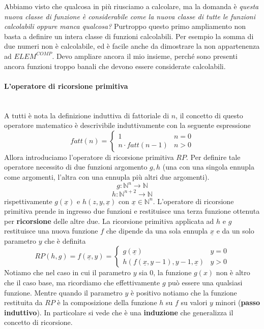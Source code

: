 \documentclass{article}
\begin{document}
Abbiamo visto che qualcosa in più riusciamo a calcolare, ma la domanda è \textit{questa
    nuova classe di funzione è considerabile come la nuova classe di tutte le funzioni
    calcolabili oppure manca qualcosa?} Purtroppo questo primo ampliamento non basta a definire
un intera classe di funzioni calcolabili. Per esempio la somma di due numeri non è
calcolabile, ed è facile anche da dimostrare la non appartenenza ad $ELEM^{COMP}$. Devo
ampliare ancora il mio insieme, perché sono presenti ancora funzioni troppo banali che devono
essere considerate calcolabili.

\paragraph{L'operatore di ricorsione primitiva}\mbox{}\\
A tutti è nota la definizione induttiva di fattoriale di $n$, il concetto di questo
operatore matematico è descrivibile induttivamente con la seguente espressione
\[
    fatt(n)=
    \begin{cases}
        1                & n=0 \\
        n\cdot fatt(n-1) & n>0
    \end{cases}
\]
Allora introduciamo l'operatore di ricorsione primitiva $RP$. Per definire tale
operatore necessito di due funzioni argomento $g,h$ (una con una singola ennupla come
argomenti, l'altra con una ennupla più altri due argomenti).
$$g:\mathbb{N}^n\rightarrow\mathbb{N}$$
$$h:\mathbb{N}^{n+2}\rightarrow\mathbb{N}$$
rispettivamente $g(\underline{x})$ e $h(z,y,\underline{x})$ con $\underline{x}\in\mathbb{N}^n$.
L'operatore di ricorsione primitiva prende in ingresso due funzioni e restituisce
una terza funzione ottenuta per \textbf{ricorsione} delle altre due. La ricorsione
primitiva applicata ad $h$ e $g$ restituisce una nuova funzione $f$ che dipende da
una sola ennupla $\underline{x}$ e da un solo parametro $y$ che è definita
\[
    RP(h,g)=f(\underline{x},y)=
    \begin{cases}
        g(\underline{x})                          & y=0 \\
        h(f(\underline{x},y-1),y-1,\underline{x}) & y>0
    \end{cases}
\]
Notiamo che nel caso in cui il parametro $y$ sia 0, la funzione $g(x)$ non è altro che
il caso base, ma ricordiamo che effettivamente $g$ può essere una qualsiasi funzione.
Mentre quando il parametro $y$ è positivo notiamo che la funzione restituita da $RP$ è
la composizione della funzione $h$ su $f$ su valori $y$ minori (\textbf{passo induttivo}).
In particolare si vede che è una \textbf{induzione} che generalizza il concetto di ricorsione.
\end{document}
